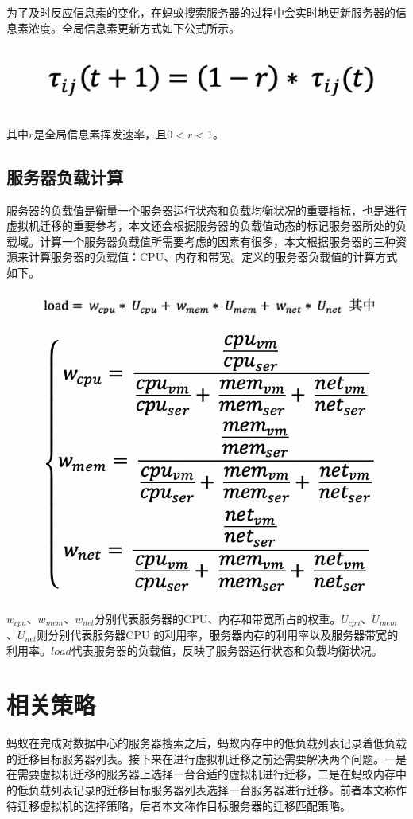 为了及时反应信息素的变化，在蚂蚁搜索服务器的过程中会实时地更新服务器的信息素浓度。全局信息素更新方式如下公式所示。

\begin{figure}[htb]
  \centering
  \includegraphics[width=0.3\linewidth]{./Figure/IMG_Chap3_6.png}
\end{figure}

其中$ r $是全局信息素挥发速率，且$ 0 < r < 1$。

\subsection{服务器负载计算}
 服务器的负载值是衡量一个服务器运行状态和负载均衡状况的重要指标，也是进行虚拟机迁移的重要参考，本文还会根据服务器的负载值动态的标记服务器所处的负载域。计算一个服务器负载值所需要考虑的因素有很多，本文根据服务器的三种资源来计算服务器的负载值：CPU、内存和带宽。定义的服务器负载值的计算方式如下。

 \begin{figure}[htb]
  \centering
  \includegraphics[width=0.6\linewidth]{./Figure/IMG_Chap3_7.png}
\end{figure}

 \begin{figure}[htb]
  \centering
  \includegraphics[width=0.5\linewidth]{./Figure/IMG_Chap3_8.png}
\end{figure}

$ w_{cpu} $、$ w_{mem} $、$ w_{net} $分别代表服务器的CPU、内存和带宽所占的权重。$ U_{cpu} $、$ U_{mem} $、$ U_{net} $则分别代表服务器CPU 的利用率，服务器内存的利用率以及服务器带宽的利用率。$ load $代表服务器的负载值，反映了服务器运行状态和负载均衡状况。

\section{相关策略}
蚂蚁在完成对数据中心的服务器搜索之后，蚂蚁内存中的低负载列表记录着低负载的迁移目标服务器列表。接下来在进行虚拟机迁移之前还需要解决两个问题。一是在需要虚拟机迁移的服务器上选择一台合适的虚拟机进行迁移，二是在蚂蚁内存中的低负载列表记录的迁移目标服务器列表选择一台服务器进行迁移。前者本文称作待迁移虚拟机的选择策略，后者本文称作目标服务器的迁移匹配策略。

